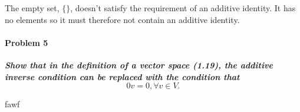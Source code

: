 The empty set, $\{\}$, doesn't satisfy the requirement of an additive identity. It has no elements so it must therefore not contain an additive identity.

\paragraph{Problem 5}
\textbf{\textit{Show that in the definition of a vector space (1.19), the additive inverse condition can be replaced with the condition that $$0v = 0, \forall v \in V.$$}}

\begin{exercise}
	fawf
\end{exercise}



























































